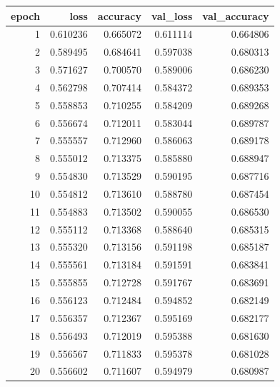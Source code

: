 \begin{tabular}{rrrrr}
\toprule
epoch & loss & accuracy & val_loss & val_accuracy \\
\midrule
1 & 0.610236 & 0.665072 & 0.611114 & 0.664806 \\
2 & 0.589495 & 0.684641 & 0.597038 & 0.680313 \\
3 & 0.571627 & 0.700570 & 0.589006 & 0.686230 \\
4 & 0.562798 & 0.707414 & 0.584372 & 0.689353 \\
5 & 0.558853 & 0.710255 & 0.584209 & 0.689268 \\
6 & 0.556674 & 0.712011 & 0.583044 & 0.689787 \\
7 & 0.555557 & 0.712960 & 0.586063 & 0.689178 \\
8 & 0.555012 & 0.713375 & 0.585880 & 0.688947 \\
9 & 0.554830 & 0.713529 & 0.590195 & 0.687716 \\
10 & 0.554812 & 0.713610 & 0.588780 & 0.687454 \\
11 & 0.554883 & 0.713502 & 0.590055 & 0.686530 \\
12 & 0.555112 & 0.713368 & 0.588640 & 0.685315 \\
13 & 0.555320 & 0.713156 & 0.591198 & 0.685187 \\
14 & 0.555561 & 0.713184 & 0.591591 & 0.683841 \\
15 & 0.555855 & 0.712728 & 0.591767 & 0.683691 \\
16 & 0.556123 & 0.712484 & 0.594852 & 0.682149 \\
17 & 0.556357 & 0.712367 & 0.595169 & 0.682177 \\
18 & 0.556493 & 0.712019 & 0.595388 & 0.681630 \\
19 & 0.556567 & 0.711833 & 0.595378 & 0.681028 \\
20 & 0.556602 & 0.711607 & 0.594979 & 0.680987 \\
\bottomrule
\end{tabular}
